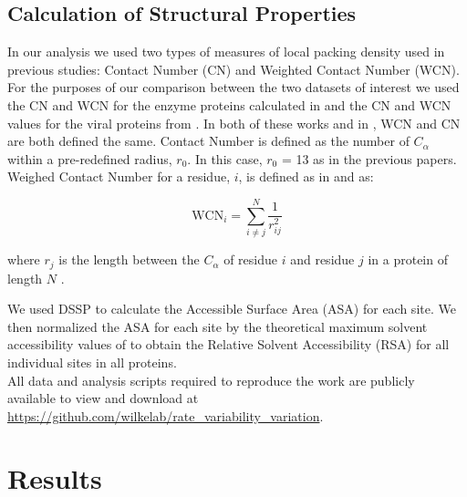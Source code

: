 \documentclass[12pt]{article}
\begin{document}
    \subsection*{Calculation of Structural Properties}
In our analysis we used two types of measures of local packing density used in previous studies: Contact Number (CN) and Weighted Contact Number (WCN). For the purposes of our comparison between the two datasets of interest we used the CN and WCN for the enzyme proteins calculated in \cite{Huangetal2014} and the CN and WCN values for the viral proteins from \cite{Shahmoradietal2014}. In both of these works and in \cite{Yehetal2014a}, WCN and CN are both defined the same.  Contact Number is defined as the number of $C_{\alpha}$ within a pre-redefined radius, $r_0$. In this case, $r_0$ = 13 as in the previous papers. Weighed Contact Number for a residue, $i$, is defined as in \cite{Liaoetal2005} and \cite{Huangetal2014} as:
	
	\begin{equation} \label{wcn_eqn}
		\text{WCN}_i = \sum_{i \neq j}^{N} \frac{1}{r_{ij}^2 } 
	\end{equation}
	
	where $r_j$ is the length between the $C_{\alpha}$ of residue $i$ and residue $j$ in a protein of length $N$ \citep{Yehetal2014a}. 

\indent We used DSSP \citep{Kabschetal2005} to calculate the Accessible Surface Area (ASA) for each site. We then normalized the ASA for each site by the theoretical maximum solvent accessibility values of \cite{Tienetal2013} to obtain the Relative Solvent Accessibility (RSA) for all individual sites in all proteins. \\

All data and analysis scripts required to reproduce the work are publicly available to view and download at \url{https://github.com/wilkelab/rate_variability_variation}.

\section{Results}
\label{sec:results}
\end{document}
